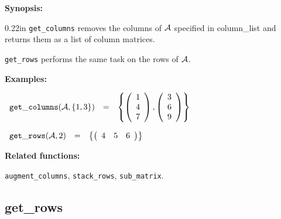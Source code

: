 {\bf Synopsis:} %

\begin{addtolength}{\leftskip}{0.22in}
{\tt get\_columns} removes the columns of ${\cal A}$ specified in
                column\_list and returns them as a list of column
                matrices.

\end{addtolength}
\hspace*{0.175in} {\tt get\_rows} performs the same task on the rows of
                ${\cal A}$.

{\bf Examples:}

\begin{flushleft}
\hspace*{0.1in}
\begin{math}
\begin{array}{ccc}
{\tt get\_columns}({\cal A},\{1,3\}) & = &
\left\{
        \left( \begin{array}{c} 1 \\ 4 \\ 7 \end{array} \right),
        \left( \begin{array}{c} 3 \\ 6 \\ 9 \end{array} \right)
\right\}
\end{array}
\end{math}
\end{flushleft}

\vspace*{0.1in}

\begin{flushleft}
\hspace*{0.1in}
\begin{math}
\begin{array}{ccc}
{\tt get\_rows}({\cal A},2) & = &
\left\{
        \left( \begin{array}{ccc} 4 & 5 & 6 \end{array} \right)
\right\}
\end{array}
\end{math}
\end{flushleft}

{\bf Related functions:}

\hspace*{0.175in} {\tt augment\_columns}, {\tt stack\_rows},
{\tt sub\_matrix}.


\subsection{get\_rows}

